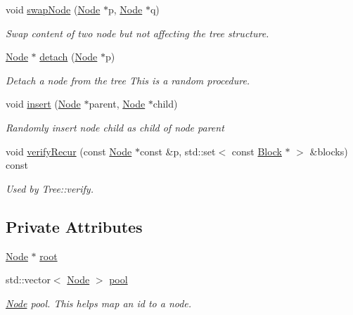 \begin{DoxyCompactItemize}
void \hyperlink{classTTree_adbb05d027840467cdce8b9489bc49225}{swap\+Node} (\hyperlink{structTTree_1_1Node}{Node} $\ast$p, \hyperlink{structTTree_1_1Node}{Node} $\ast$q)
\begin{DoxyCompactList}\small\item\em Swap content of two node but not affecting the tree structure. \end{DoxyCompactList}\item 
\hyperlink{structTTree_1_1Node}{Node} $\ast$ \hyperlink{classTTree_ab9b74f48afd54c16fd1dc3b598019f7f}{detach} (\hyperlink{structTTree_1_1Node}{Node} $\ast$p)
\begin{DoxyCompactList}\small\item\em Detach a node from the tree This is a random procedure. \end{DoxyCompactList}\item 
void \hyperlink{classTTree_a0bc18fd4039dc1ae0a53d2b68741a92b}{insert} (\hyperlink{structTTree_1_1Node}{Node} $\ast$parent, \hyperlink{structTTree_1_1Node}{Node} $\ast$child)
\begin{DoxyCompactList}\small\item\em Randomly insert node {\ttfamily child} as child of node {\ttfamily parent} \end{DoxyCompactList}\item 
void \hyperlink{classTTree_ab5eff05ab8d8365737b1eef83ac3ee87}{verify\+Recur} (const \hyperlink{structTTree_1_1Node}{Node} $\ast$const \&p, std\+::set$<$ const \hyperlink{structBlock}{Block} $\ast$ $>$ \&blocks) const 
\begin{DoxyCompactList}\small\item\em Used by Tree\+::verify. \end{DoxyCompactList}\end{DoxyCompactItemize}
\subsection*{Private Attributes}
\begin{DoxyCompactItemize}
\item 
\hyperlink{structTTree_1_1Node}{Node} $\ast$ \hyperlink{classTTree_a76972bd24a6d2f940fe1645d008a4a04}{root}
\item 
std\+::vector$<$ \hyperlink{structTTree_1_1Node}{Node} $>$ \hyperlink{classTTree_a58f7a793347834e9caee3d87c7202966}{pool}
\begin{DoxyCompactList}\small\item\em \hyperlink{structTTree_1_1Node}{Node} pool. This helps map an id to a node. \end{DoxyCompactList}\end{DoxyCompactItemize}



